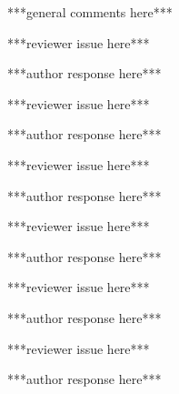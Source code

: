 \documentclass[10pt]{article}
\begin{document}

\begin{authors}
	***general comments here***
\end{authors}



\begin{reviewers}
	***reviewer issue here***
\end{reviewers}

\begin{authors}
	***author response here***
\end{authors}


\begin{reviewers}
	***reviewer issue here***
\end{reviewers}

\begin{authors}
	***author response here***
\end{authors}


\nextreviewer

\begin{reviewers}
	***reviewer issue here***
\end{reviewers}

\begin{authors}
	***author response here***
\end{authors}

\begin{reviewers}
	***reviewer issue here***
\end{reviewers}

\begin{authors}
	***author response here***
\end{authors}



\nextreviewer

\begin{reviewers}
	***reviewer issue here***
\end{reviewers}

\begin{authors}
	***author response here***
\end{authors}

\begin{reviewers}
	***reviewer issue here***
\end{reviewers}

\begin{authors}
	***author response here***
\end{authors}
\end{document}
